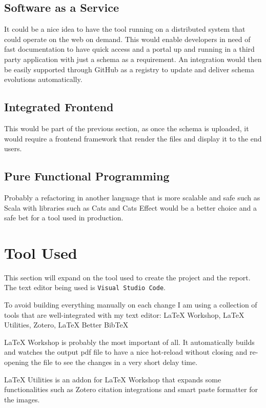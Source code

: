 \subsection{Software as a Service}
\label{s:SaaS}
It could be a nice idea to have the tool running on a distributed system that
could operate on the web on demand. This would enable developers in need of fast
documentation to have quick access and a portal up and running in a third party
application with just a schema as a requirement. An integration would then be
easily supported through GitHub as a registry to update and deliver schema
evolutions automatically.

\subsection{Integrated Frontend}
\label{s:Integrated-Frontend}
This would be part of the previous section, as once the schema is uploaded, it
would require a frontend framework that render the files and display it to the
end users.

\subsection{Pure Functional Programming}
\label{s:Pure-Functional-Programming}
Probably a refactoring in another language that is more scalable and safe such
as Scala with libraries such as Cats and Cats Effect would be a better choice
and a safe bet for a tool used in production.

\section{Tool Used}
\label{s:Tool-Used}
This section will expand on the tool used to create the project and the report.
The text editor being used is \texttt{Visual Studio Code}.

To avoid building everything manually on each change I am using a collection of
tools that are well-integrated with my text editor: LaTeX Workshop, LaTeX
Utilities, Zotero, LaTeX Better BibTeX

LaTeX Workshop is probably the most important of all. It automatically builds
and watches the output pdf file to have a nice hot-reload without closing and
re-opening the file to see the changes in a very short delay time.

LaTeX Utilities is an addon for LaTeX Workshop that expands some
functionalities such as Zotero citation integrations and smart paste formatter
for the images.

